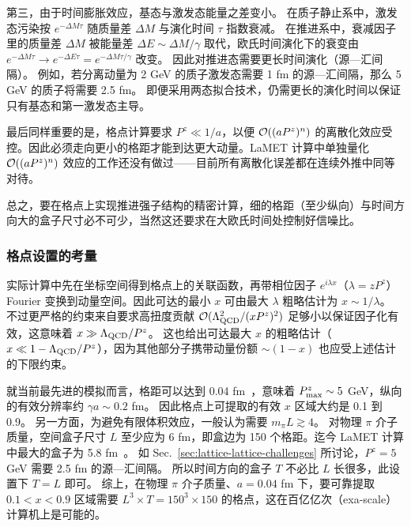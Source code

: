 第三，由于时间膨胀效应，基态与激发态能量之差变小。
%
在质子静止系中，激发态污染按 $e^{-\Delta M \tau}$ 随质量差 $\Delta M$ 与演化时间 $\tau$ 指数衰减。
%
在推进系中，衰减因子里的质量差 $\Delta M$ 被能量差 $\Delta E \sim \Delta M/\gamma$ 取代，欧氏时间演化下的衰变由 $e^{-\Delta M \tau} \to e^{-\Delta E \tau}=e^{-\Delta M \tau / \gamma}$ 改变。
%
因此对推进态需要更长时间演化（源—汇间隔）。
%
例如，若分离动量为 2 GeV 的质子激发态需要 1 fm 的源—汇间隔，那么 5 GeV 的质子将需要 2.5 fm。
%
即便采用两态拟合技术，仍需更长的演化时间以保证只有基态和第一激发态主导。

最后同样重要的是，格点计算要求 $P^z\ll 1/a$，以便 ${\cal O}((aP^z)^n)$ 的离散化效应受控。因此必须走向更小的格距才能到达更大动量。LaMET 计算中单独量化 ${\cal O}((aP^z)^n)$ 效应的工作还没有做过——目前所有离散化误差都在连续外推中同等对待。

总之，要在格点上实现推进强子结构的精密计算，细的格距（至少纵向）与时间方向大的盒子尺寸必不可少，当然这还要求在大欧氏时间处控制好信噪比。

\subsubsection{格点设置的考量}
\label{sec:lattice-lattice-special}


实际计算中先在坐标空间得到格点上的关联函数，再带相位因子 $e^{i\lambda x}$（$\lambda=zP^z$）Fourier 变换到动量空间。因此可达的最小 $x$ 可由最大 $\lambda$ 粗略估计为 $x\sim 1/\lambda$。
%
不过更严格的约束来自要求高扭度贡献 ${\cal O}(\Lambda_{\rm QCD}^2/(xP^z)^2)$ 足够小以保证因子化有效，这意味着 $x\gg \Lambda_{\rm QCD}/P^z$。
%
这也给出可达最大 $x$ 的粗略估计（$x\ll 1-\Lambda_{\rm QCD}/P^z$），因为其他部分子携带动量份额 $\sim (1-x)$ 也应受上述估计的下限约束。


就当前最先进的模拟而言，格距可以达到 0.04 fm~\cite{Fan:2020nzz,Gao:2020ito}，意味着 $P^z_{\rm max}\sim 5$ GeV，纵向的有效分辨率约 $\gamma a\sim 0.2$ fm。
%
因此格点上可提取的有效 $x$ 区域大约是 0.1 到 0.9。
%
另一方面，为避免有限体积效应，一般认为需要 $m_\pi L\gtrsim 4$。
%
对物理 $\pi$ 介子质量，空间盒子尺寸 $L$ 至少应为 6 fm，即盒边为 150 个格距。迄今 LaMET 计算中最大的盒子为 5.8 fm~\cite{Lin:2018qky}。
%
如 Sec.~\ref{sec:lattice-lattice-challenges} 所讨论，$P^z=5$ GeV 需要 2.5 fm 的源—汇间隔。
%
所以时间方向的盒子 $T$ 不必比 $L$ 长很多，此设置下 $T=L$ 即可。
%
综上，在物理 $\pi$ 介子质量、$a=0.04$ fm 下，要可靠提取 $0.1<x<0.9$ 区域需要 $L^3\times T=150^3\times 150$ 的格点，这在百亿亿次（exa-scale）计算机上是可能的。

